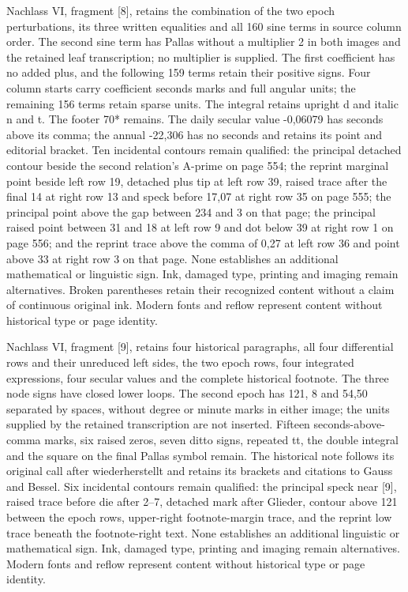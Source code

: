 Nachlass VI, fragment [8], retains the combination of the two epoch perturbations, its three written equalities and all 160 sine terms in source column order. The second sine term has Pallas without a multiplier 2 in both images and the retained leaf transcription; no multiplier is supplied. The first coefficient has no added plus, and the following 159 terms retain their positive signs. Four column starts carry coefficient seconds marks and full angular units; the remaining 156 terms retain sparse units. The integral retains upright d and italic n and t. The footer 70* remains. The daily secular value -0,06079 has seconds above its comma; the annual -22,306 has no seconds and retains its point and editorial bracket. Ten incidental contours remain qualified: the principal detached contour beside the second relation's A-prime on page 554; the reprint marginal point beside left row 19, detached plus tip at left row 39, raised trace after the final 14 at right row 13 and speck before 17,07 at right row 35 on page 555; the principal point above the gap between 234 and 3 on that page; the principal raised point between 31 and 18 at left row 9 and dot below 39 at right row 1 on page 556; and the reprint trace above the comma of 0,27 at left row 36 and point above 33 at right row 3 on that page. None establishes an additional mathematical or linguistic sign. Ink, damaged type, printing and imaging remain alternatives. Broken parentheses retain their recognized content without a claim of continuous original ink. Modern fonts and reflow represent content without historical type or page identity.

Nachlass VI, fragment [9], retains four historical paragraphs, all four differential rows and their unreduced left sides, the two epoch rows, four integrated expressions, four secular values and the complete historical footnote. The three node signs have closed lower loops. The second epoch has 121, 8 and 54,50 separated by spaces, without degree or minute marks in either image; the units supplied by the retained transcription are not inserted. Fifteen seconds-above-comma marks, six raised zeros, seven ditto signs, repeated tt, the double integral and the square on the final Pallas symbol remain. The historical note follows its original call after wiederherstellt and retains its brackets and citations to Gauss and Bessel. Six incidental contours remain qualified: the principal speck near [9], raised trace before die after 2–7, detached mark after Glieder, contour above 121 between the epoch rows, upper-right footnote-margin trace, and the reprint low trace beneath the footnote-right text. None establishes an additional linguistic or mathematical sign. Ink, damaged type, printing and imaging remain alternatives. Modern fonts and reflow represent content without historical type or page identity.

